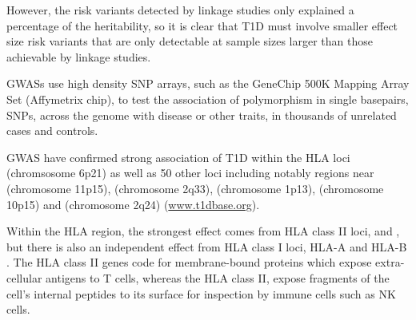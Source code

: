 


However, the risk variants detected by linkage studies only explained a percentage of the heritability,
so it is clear that T1D must involve smaller effect size risk variants that are only detectable at sample sizes larger than those achievable by linkage studies.


\Glspl{GWAS} use high density \gls{SNP} arrays, such as the GeneChip 500K Mapping Array Set (Affymetrix chip),
to test the association of polymorphism in single basepairs, \glspl{SNP}, across the genome with disease or other traits,
in thousands of unrelated cases and controls.


\Gls{GWAS} have confirmed strong association of T1D within the \Gls{HLA} loci (chromsosome 6p21) as well as 50 other loci including notably regions near
 (chromosome 11p15),  (chromosome 2q33),  (chromosome 1p13),  (chromosome 10p15)
and  (chromosome 2q24) \citep{Burton:2007hta,Barrett:2009jq}
(\url{www.t1dbase.org}).

Within the HLA region, the strongest effect comes from HLA class II loci,  and ,
but there is also an independent effect from HLA class I loci, HLA-A and HLA-B \citep{Howson:2009bl}.
The HLA class II genes code for membrane-bound proteins which expose extra-cellular antigens to T cells,
whereas the HLA class II, expose fragments of the cell's internal peptides to its surface for inspection by immune cells such as \gls{NK} cells.


